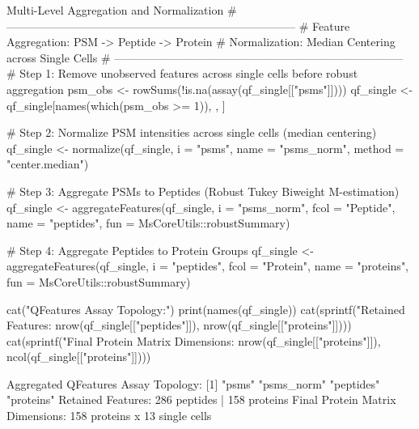 \documentclass[11pt,twoside,openright]{book}
\begin{document}
\begin{rchunk}{Multi-Level Aggregation and Normalization}
# -----------------------------------------------------------------------------
# Feature Aggregation: PSM -> Peptide -> Protein
# Normalization: Median Centering across Single Cells
# -----------------------------------------------------------------------------
# Step 1: Remove unobserved features across single cells before robust aggregation
psm_obs <- rowSums(!is.na(assay(qf_single[["psms"]])))
qf_single <- qf_single[names(which(psm_obs >= 1)), , ]

# Step 2: Normalize PSM intensities across single cells (median centering)
qf_single <- normalize(qf_single,
                       i = "psms",
                       name = "psms_norm",
                       method = "center.median")

# Step 3: Aggregate PSMs to Peptides (Robust Tukey Biweight M-estimation)
qf_single <- aggregateFeatures(qf_single,
                               i = "psms_norm",
                               fcol = "Peptide",
                               name = "peptides",
                               fun = MsCoreUtils::robustSummary)

# Step 4: Aggregate Peptides to Protein Groups
qf_single <- aggregateFeatures(qf_single,
                               i = "peptides",
                               fcol = "Protein",
                               name = "proteins",
                               fun = MsCoreUtils::robustSummary)

cat("\nAggregated QFeatures Assay Topology:\n")
print(names(qf_single))
cat(sprintf("Retained Features: %
            nrow(qf_single[["peptides"]]), nrow(qf_single[["proteins"]])))
cat(sprintf("Final Protein Matrix Dimensions: %
            nrow(qf_single[["proteins"]]), ncol(qf_single[["proteins"]])))
\end{rchunk}

\begin{routput}
Aggregated QFeatures Assay Topology:
{}[1] "psms"      "psms\_norm" "peptides"  "proteins" 
Retained Features: 286 peptides | 158 proteins
Final Protein Matrix Dimensions: 158 proteins x 13 single cells
\end{routput}
\end{document}
